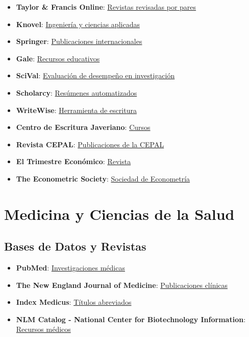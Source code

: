 \documentclass[
  jou,
  floatsintext,
  longtable,
  a4paper,
  nolmodern,
  notxfonts,
  notimes,
  colorlinks=true,linkcolor=blue,citecolor=blue,urlcolor=blue]{apa7}
\providecommand{\tightlist}{%
  \setlength{\itemsep}{0pt}\setlength{\parskip}{0pt}}
\begin{document}
\begin{itemize}
\item
  \textbf{Taylor \& Francis Online}:
  \href{https://www.tandfonline.com/}{Revistas revisadas por pares}
\item
  \textbf{Knovel}: \href{https://app.knovel.com/kn}{Ingeniería y
  ciencias aplicadas}
\item
  \textbf{Springer}: \href{https://www.springer.com/la}{Publicaciones
  internacionales}
\item
  \textbf{Gale}: \href{https://www.gale.com/}{Recursos educativos}
\item
  \textbf{SciVal}:
  \href{https://www.elsevier.com/products/scival}{Evaluación de
  desempeño en investigación}
\item
  \textbf{Scholarcy}: \href{https://www.scholarcy.com/}{Resúmenes
  automatizados}
\item
  \textbf{WriteWise}: \href{https://web.writewise.io/?nab=5}{Herramienta
  de escritura}
\item
  \textbf{Centro de Escritura Javeriano}:
  \href{https://centrodeescriturajaveriano.thinkific.com/enrollments}{Cursos}
\item
  \textbf{Revista CEPAL}:
  \href{https://www.cepal.org/es/publicaciones/tipo/revista-cepal}{Publicaciones
  de la CEPAL}
\item
  \textbf{El Trimestre Económico}:
  \href{https://www.eltrimestreeconomico.com.mx/index.php/te}{Revista}
\item
  \textbf{The Econometric Society}:
  \href{https://www.econometricsociety.org/}{Sociedad de Econometría}
\end{itemize}

\section{Medicina y Ciencias de la
Salud}\label{medicina-y-ciencias-de-la-salud}

\subsection{Bases de Datos y Revistas}\label{bases-de-datos-y-revistas}

\begin{itemize}
\tightlist
\item
  \textbf{PubMed}:
  \href{https://pubmed.ncbi.nlm.nih.gov/}{Investigaciones médicas}
\item
  \textbf{The New England Journal of Medicine}:
  \href{https://www.nejm.org/}{Publicaciones clínicas}
\item
  \textbf{Index Medicus}:
  \href{http://www2.bg.ump.edu.pl/czasopisma/medicus.php?lang=eng}{Títulos
  abreviados}
\item
  \textbf{NLM Catalog - National Center for Biotechnology Information}:
  \href{https://www.ncbi.nlm.nih.gov/}{Recursos médicos}
\end{itemize}
\end{document}
